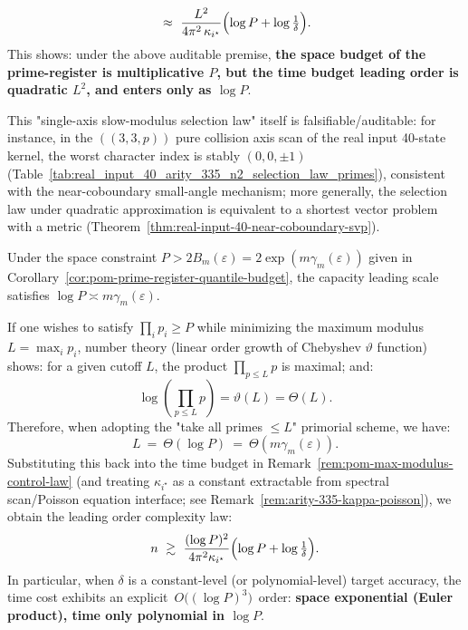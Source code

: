 \begin{remark}
\[\ \approx\
\frac{L^2}{4\pi^2\,\kappa_{i^\star}}\Bigl(\log P+\log\tfrac{1}{\delta}\Bigr).
\]
This shows: under the above auditable premise, \textbf{the space budget of the prime-register is multiplicative $P$, but the time budget leading order is quadratic $L^2$, and enters only as $\log P$}.
\par
This "single-axis slow-modulus selection law" itself is falsifiable/auditable: for instance, in the $((3,3,p))$ pure collision axis scan of the real input 40-state kernel, the worst character index is stably $(0,0,\pm1)$ (Table~\ref{tab:real_input_40_arity_335_n2_selection_law_primes}), consistent with the near-coboundary small-angle mechanism; more generally, the selection law under quadratic approximation is equivalent to a shortest vector problem with a metric (Theorem~\ref{thm:real-input-40-near-coboundary-svp}).
\end{remark}

\begin{remark}\label{rem:pom-primorial-polylog-time}
Under the space constraint
\(
P>2B_m(\varepsilon)=2\exp(m\gamma_m(\varepsilon))
\)
given in Corollary~\ref{cor:pom-prime-register-quantile-budget}, the capacity leading scale satisfies $\log P\asymp m\gamma_m(\varepsilon)$.
\par
If one wishes to satisfy $\prod_i p_i\ge P$ while minimizing the maximum modulus $L=\max_i p_i$, number theory (linear order growth of Chebyshev $\vartheta$ function) shows: for a given cutoff $L$, the product $\prod_{p\le L}p$ is maximal; and:
\[
\log\!\left(\prod_{p\le L}p\right)=\vartheta(L)=\Theta(L).
\]
Therefore, when adopting the "take all primes $\le L$" primorial scheme, we have:
\[
L\ =\ \Theta(\log P)\ =\ \Theta(m\gamma_m(\varepsilon)).
\]
Substituting this back into the time budget in Remark~\ref{rem:pom-max-modulus-control-law} (and treating $\kappa_{i^\star}$ as a constant extractable from spectral scan/Poisson equation interface; see Remark~\ref{rem:arity-335-kappa-poisson}), we obtain the leading order complexity law:
\[
n\ \gtrsim\ \frac{(\log P)^2}{4\pi^2\kappa_{i^\star}}\Bigl(\log P+\log\tfrac{1}{\delta}\Bigr).
\]
In particular, when $\delta$ is a constant-level (or polynomial-level) target accuracy, the time cost exhibits an explicit $\,O\big((\log P)^3\big)\,$ order: \textbf{space exponential (Euler product), time only polynomial in $\log P$}.
\end{remark}

